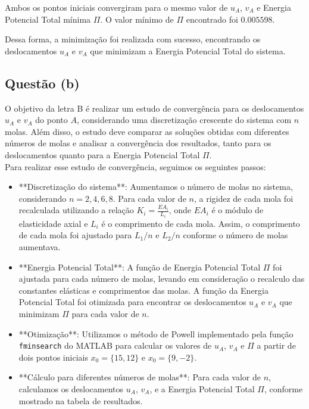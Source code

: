 \documentclass[a4paper, 12pt]{article}
\begin{document}
Ambos os pontos iniciais convergiram para o mesmo valor de \( u_A \), \( v_A \) e Energia Potencial Total mínima \( \Pi \). O valor mínimo de \( \Pi \) encontrado foi \( 0.005598 \).

Dessa forma, a minimização foi realizada com sucesso, encontrando os deslocamentos \( u_A \) e \( v_A \) que minimizam a Energia Potencial Total do sistema.

\newpage
\subsection{Questão (b)}
O objetivo da letra B é realizar um estudo de convergência para os deslocamentos \( u_A \) e \( v_A \) do ponto \( A \), considerando uma discretização crescente do sistema com \( n \) molas. Além disso, o estudo deve comparar as soluções obtidas com diferentes números de molas e analisar a convergência dos resultados, tanto para os deslocamentos quanto para a Energia Potencial Total \( \Pi \).\\


Para realizar esse estudo de convergência, seguimos os seguintes passos:

\begin{itemize}
    \item **Discretização do sistema**: Aumentamos o número de molas no sistema, considerando \( n = 2, 4, 6, 8 \). Para cada valor de \( n \), a rigidez de cada mola foi recalculada utilizando a relação \( K_i = \frac{EA_i}{L_i} \), onde \( EA_i \) é o módulo de elasticidade axial e \( L_i \) é o comprimento de cada mola. Assim, o comprimento de cada mola foi ajustado para \( L_1/n \) e \( L_2/n \) conforme o número de molas aumentava.
    
    \item **Energia Potencial Total**: A função de Energia Potencial Total \( \Pi \) foi ajustada para cada número de molas, levando em consideração o recalculo das constantes elásticas e comprimentos das molas. A função da Energia Potencial Total foi otimizada para encontrar os deslocamentos \( u_A \) e \( v_A \) que minimizam \( \Pi \) para cada valor de \( n \).
    
    \item **Otimização**: Utilizamos o método de Powell implementado pela função \texttt{fminsearch} do MATLAB para calcular os valores de \( u_A \), \( v_A \) e \( \Pi \) a partir de dois pontos iniciais \( x_0 = \{15, 12\} \) e \( x_0 = \{9, -2\} \).

    \item **Cálculo para diferentes números de molas**: Para cada valor de \( n \), calculamos os deslocamentos \( u_A \), \( v_A \), e a Energia Potencial Total \( \Pi \), conforme mostrado na tabela de resultados.
\end{itemize}
\end{document}
